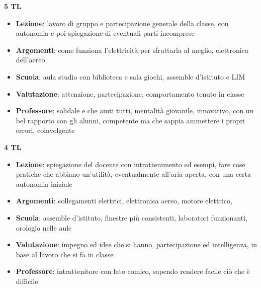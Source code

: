 \documentclass{article}
\begin{document}
	\begin{center}
	\textbf{5 TL}
	\end{center}
	\begin{itemize}
	\item \textbf{Lezione}: lavoro di gruppo e partecipazione generale della classe, con autonomia e poi spiegazione di eventuali parti incomprese
	\item \textbf{Argomenti}: come funziona l'elettricità per sfruttarla al meglio, elettronica dell'aereo
	\item \textbf{Scuola}: aula studio con biblioteca e sala giochi, assemble d'istituto e LIM
	\item \textbf{Valutazione}: attenzione, partecipazione, comportamento tenuto in classe
	\item \textbf{Professore}: solidale e che aiuti tutti, mentalità giovanile, innovativo, con un bel rapporto con gli alunni, competente ma che sappia ammettere i propri errori, coinvolgente
	\end{itemize}
	
	\begin{center}
	\textbf{4 TL}
	\end{center}
	\begin{itemize}
	\item \textbf{Lezione}: spiegazione del docente con intrattenimento ed esempi, fare cose pratiche che abbiano un'utilità, eventualmente all'aria aperta, con una certa autonomia iniziale
	\item \textbf{Argomenti}: collegamenti elettrici, elettronica aereo, motore elettrico, 
	\item \textbf{Scuola}: assemble d'istituto, finestre più consistenti, laboratori funzionanti, orologio nelle aule
	\item \textbf{Valutazione}: impegno ed idee che si hanno, partecipazione ed intelligenza, in base al lavoro che si fa in classe
	\item \textbf{Professore}: intrattenitore con lato comico, sapendo rendere facile ciò che è difficile
	\end{itemize}
	
\end{document}
